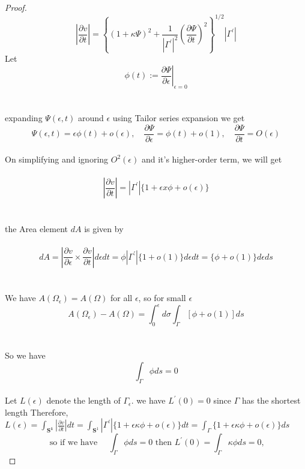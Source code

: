 \documentclass[oneside]{book}
\begin{document}
\begin{proof}
                    $$\left|\frac{\partial v}{\partial t}\right|=\left\{(1+\kappa \Psi)^{2}+\frac{1}{\left|\Gamma^{\prime}\right|^{2}}\left(\frac{\partial \Psi}{\partial t}\right)^{2}\right\}^{1 / 2}\left|\Gamma^{\prime}\right|$$
Let   \\
                     
                      $$\phi(t):=\left.\frac{\partial \Psi}{\partial \epsilon}\right|_{\epsilon=0}$$ \\\\
                      
expanding $\Psi(\epsilon, t)$ around $\epsilon$ using Tailor series expansion we get \\

$$
\Psi(\epsilon, t)=\epsilon \phi(t)+o(\epsilon), \quad \frac{\partial \Psi}{\partial \epsilon}=\phi(t)+o(1), \quad \frac{\partial \Psi}{\partial t}=O(\epsilon)
$$ \\
On simplifying and ignoring $O^2(\epsilon)$ and it's higher-order term, we will get \\\\
$$
\left|\frac{\partial v}{\partial t}\right|=\left|\Gamma^{\prime}\right|\{1+\epsilon x \phi+o(\epsilon)\}
$$ 
\\\\
 the Area element $d A$  is given by
 \\\\
     \begin{equation}
     \label{eq13}  
d A=\left|\frac{\partial v}{\partial \epsilon} \times \frac{\partial v}{\partial t}\right| d \epsilon d t=\phi\left|\Gamma^{\prime}\right|\{1+o(1)\} d \epsilon d t=\{\phi+o(1)\} d \epsilon d s
    \end{equation} \\\\
We have $A\left(\Omega_{\epsilon}\right)=A(\Omega)$ for all $\epsilon$, so for small $\epsilon$ \\

 $$
A\left(\Omega_{\epsilon}\right)-A(\Omega)=\int_{0}^{\epsilon} d \sigma \int_{\Gamma}[\phi+o(1)] d s
$$
\\\\
So we have \\
$$  
\int_{\Gamma} \phi d s=0
$$ \\
 Let $L(\epsilon)$ denote the length of $\Gamma_{\epsilon} .$  we have
$L^{\prime}(0)=0$ since $\Gamma$ has the shortest length Therefore,
$L(\epsilon)=\int_{\mathbf{S^1}}\left|\frac{\partial v}{\partial t}\right| d t=\int_{\mathbf{S}^{1}}\left|\Gamma^{\prime}\right|\{1+\epsilon \kappa \phi+o(\epsilon)\} d t=\int_{\Gamma}\{1+\epsilon \kappa \phi+o(\epsilon)\} d s$
$$
  \text{ so if we have } \quad \int_{\Gamma} \phi d s=0 \text{ then }
L^{\prime}(0)=\int_{\Gamma} \kappa \phi d s=0, 
$$

\end{proof} 
\end{document}
